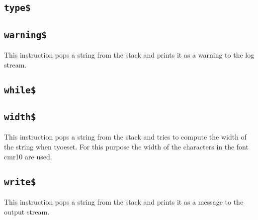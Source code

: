 \INCOMPLETE

\subsection{\texttt{type\$}}

\INCOMPLETE

\subsection{\texttt{warning\$}}

This instruction pops a string from the stack and prints it as a
warning to the log stream.

\subsection{\texttt{while\$}}

\INCOMPLETE

\subsection{\texttt{width\$}}

This instruction pops a string from the stack and tries to compute the
width of the string when tyoeset. For this purpose the width of the
characters in the font cmr10 are used.

\subsection{\texttt{write\$}}

This instruction pops a string from the stack and prints it as a
message to the output stream.


\endinput
%
